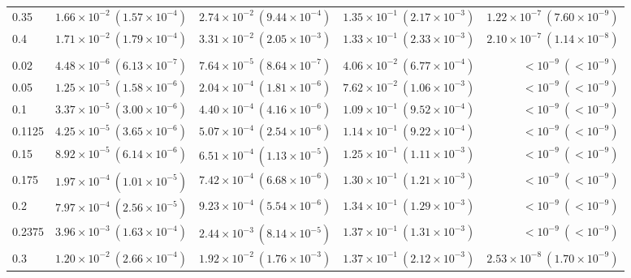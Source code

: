 \begin{table}[htbp]
\begin{tabular}{@{} l rrrr @{}}
0.35 & $1.66\!\times\!10^{-2}\ (1.57\!\times\!10^{-4})$ & $2.74\!\times\!10^{-2}\ (9.44\!\times\!10^{-4})$ & $1.35\!\times\!10^{-1}\ (2.17\!\times\!10^{-3})$ & $1.22\!\times\!10^{-7}\ (7.60\!\times\!10^{-9})$ \\
0.4 & $1.71\!\times\!10^{-2}\ (1.79\!\times\!10^{-4})$ & $3.31\!\times\!10^{-2}\ (2.05\!\times\!10^{-3})$ & $1.33\!\times\!10^{-1}\ (2.33\!\times\!10^{-3})$ & $2.10\!\times\!10^{-7}\ (1.14\!\times\!10^{-8})$ \\
\addlinespace
\multicolumn{5}{@{}l}{\textit{Medium ($p \sim \mathcal{U}(0.1125, 0.2375)$)}} \\
0.02 & $4.48\!\times\!10^{-6}\ (6.13\!\times\!10^{-7})$ & $7.64\!\times\!10^{-5}\ (8.64\!\times\!10^{-7})$ & $4.06\!\times\!10^{-2}\ (6.77\!\times\!10^{-4})$ & $<\!10^{-9}\ (<\!10^{-9})$ \\
0.05 & $1.25\!\times\!10^{-5}\ (1.58\!\times\!10^{-6})$ & $2.04\!\times\!10^{-4}\ (1.81\!\times\!10^{-6})$ & $7.62\!\times\!10^{-2}\ (1.06\!\times\!10^{-3})$ & $<\!10^{-9}\ (<\!10^{-9})$ \\
0.1 & $3.37\!\times\!10^{-5}\ (3.00\!\times\!10^{-6})$ & $4.40\!\times\!10^{-4}\ (4.16\!\times\!10^{-6})$ & $1.09\!\times\!10^{-1}\ (9.52\!\times\!10^{-4})$ & $<\!10^{-9}\ (<\!10^{-9})$ \\
0.1125 & $4.25\!\times\!10^{-5}\ (3.65\!\times\!10^{-6})$ & $5.07\!\times\!10^{-4}\ (2.54\!\times\!10^{-6})$ & $1.14\!\times\!10^{-1}\ (9.22\!\times\!10^{-4})$ & $<\!10^{-9}\ (<\!10^{-9})$ \\
0.15 & $8.92\!\times\!10^{-5}\ (6.14\!\times\!10^{-6})$ & $6.51\!\times\!10^{-4}\ (1.13\!\times\!10^{-5})$ & $1.25\!\times\!10^{-1}\ (1.11\!\times\!10^{-3})$ & $<\!10^{-9}\ (<\!10^{-9})$ \\
0.175 & $1.97\!\times\!10^{-4}\ (1.01\!\times\!10^{-5})$ & $7.42\!\times\!10^{-4}\ (6.68\!\times\!10^{-6})$ & $1.30\!\times\!10^{-1}\ (1.21\!\times\!10^{-3})$ & $<\!10^{-9}\ (<\!10^{-9})$ \\
0.2 & $7.97\!\times\!10^{-4}\ (2.56\!\times\!10^{-5})$ & $9.23\!\times\!10^{-4}\ (5.54\!\times\!10^{-6})$ & $1.34\!\times\!10^{-1}\ (1.29\!\times\!10^{-3})$ & $<\!10^{-9}\ (<\!10^{-9})$ \\
0.2375 & $3.96\!\times\!10^{-3}\ (1.63\!\times\!10^{-4})$ & $2.44\!\times\!10^{-3}\ (8.14\!\times\!10^{-5})$ & $1.37\!\times\!10^{-1}\ (1.31\!\times\!10^{-3})$ & $<\!10^{-9}\ (<\!10^{-9})$ \\
0.3 & $1.20\!\times\!10^{-2}\ (2.66\!\times\!10^{-4})$ & $1.92\!\times\!10^{-2}\ (1.76\!\times\!10^{-3})$ & $1.37\!\times\!10^{-1}\ (2.12\!\times\!10^{-3})$ & $2.53\!\times\!10^{-8}\ (1.70\!\times\!10^{-9})$ \\

\end{tabular}
\end{table}
